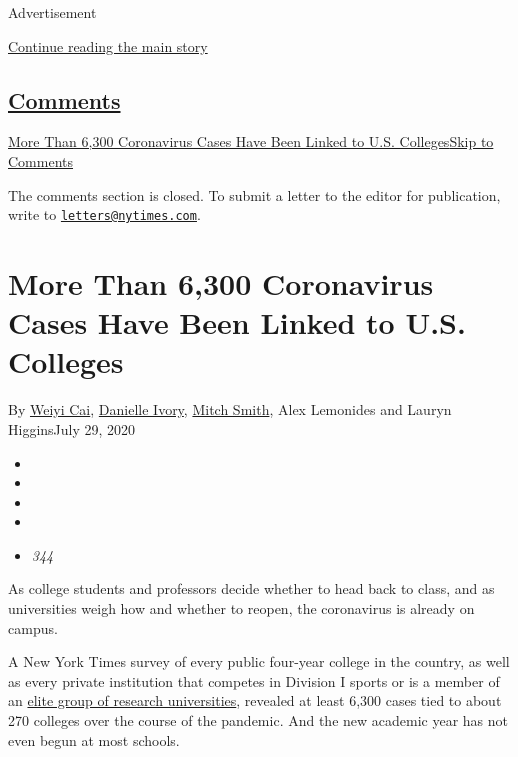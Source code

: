 Advertisement

\protect\hyperlink{after-top}{Continue reading the main story}

\hypertarget{comments}{%
\subsection{\texorpdfstring{\protect\hyperlink{commentsContainer}{Comments}}{Comments}}\label{comments}}

\href{}{More Than 6,300 Coronavirus Cases Have Been Linked to U.S.
Colleges}\href{}{Skip to Comments}

The comments section is closed. To submit a letter to the editor for
publication, write to
\href{mailto:letters@nytimes.com}{\nolinkurl{letters@nytimes.com}}.

\hypertarget{more-than-6300-coronavirus-cases-have-been-linked-to-us-colleges}{%
\section{More Than 6,300 Coronavirus Cases Have Been Linked to U.S.
Colleges}\label{more-than-6300-coronavirus-cases-have-been-linked-to-us-colleges}}

By \href{https://www.nytimes.com/by/weiyi-cai}{Weiyi Cai},
\href{https://www.nytimes.com/by/danielle-ivory}{Danielle Ivory},
\href{https://www.nytimes.com/by/mitch-smith}{Mitch Smith}, Alex
Lemonides and Lauryn HigginsJuly 29, 2020

\begin{itemize}
\item
\item
\item
\item
\item
  \emph{344}
\end{itemize}

As college students and professors decide whether to head back to class,
and as universities weigh how and whether to reopen, the coronavirus is
already on campus.

A New York Times survey of every public four-year college in the
country, as well as every private institution that competes in Division
I sports or is a member of an
\href{https://www.aau.edu/sites/default/files/AAU-Files/Who-We-Are/AAU-Member-List.pdf}{elite
group of research universities}, revealed at least 6,300 cases tied to
about 270 colleges over the course of the pandemic. And the new academic
year has not even begun at most schools.

